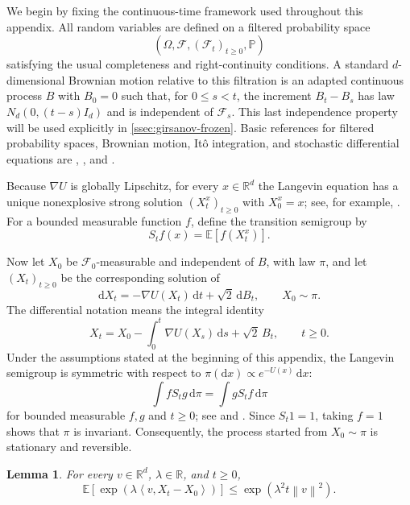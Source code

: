 \documentclass[11pt]{article}
\newtheorem{lemma}[lemma]{Lemma}
\newcommand{\R}{\mathbb R}
\newcommand{\E}{\mathbb E}
\newcommand{\ip}[2]{\left\langle #1,#2\right\rangle}
\newcommand{\norm}[1]{\left\lVert #1\right\rVert}
\newcommand{\1}{\mathbf 1}
\newcommand{\df}{\mathrm{d}}
\begin{document}
	We begin by fixing the continuous-time framework used throughout this
	appendix. All random variables are defined on a filtered probability
	space
	\[
	(\Omega,\mathcal F,(\mathcal F_t)_{t\geq0},\mathbb P)
	\]
	satisfying the usual completeness and right-continuity conditions.
	A standard \(d\)-dimensional Brownian motion relative to this filtration
	is an adapted continuous process \(B\) with \(B_0=0\) such that, for
	\(0\leq s<t\), the increment \(B_t-B_s\) has law
	\(N_d(0,(t-s)I_d)\) and is independent of \(\mathcal F_s\).
	This last independence property will be used explicitly in
	\cref{ssec:girsanov-frozen}.
	Basic references for filtered probability spaces, Brownian motion,
	It\^o integration, and stochastic differential equations are
	\citet[Chapters~3 and~5]{KaratzasShreve1991},
	\citet[Chapters~IV and~IX]{RevuzYor1999}, and
	\citet{Kallenberg2021}.
	
	Because \(\nabla U\) is globally Lipschitz, for every \(x\in\R^d\)
	the Langevin equation has a unique nonexplosive strong solution
	\((X_t^x)_{t\geq0}\) with \(X_0^x=x\); see, for example,
	\citet[Chapter~5]{KaratzasShreve1991}.
	For a bounded measurable function \(f\), define the transition
	semigroup by
	\[
	S_tf(x)=\E[f(X_t^x)].
	\]
	
	Now let \(X_0\) be \(\mathcal F_0\)-measurable and independent of \(B\),
	with law \(\pi\), and let \((X_t)_{t\geq0}\) be the corresponding
	solution of
	\begin{equation}\label{eq:langevin-sde}
		\df X_t=-\nabla U(X_t)\,\df t+\sqrt{2}\,\df B_t,
		\qquad X_0\sim\pi.
	\end{equation}
	The differential notation means the integral identity
	\begin{equation}\label{eq:langevin-integral}
		X_t=X_0-\int_0^t\nabla U(X_s)\,\df s+\sqrt{2}\,B_t,
		\qquad t\geq0.
	\end{equation}
	Under the assumptions stated at the beginning of this appendix,
	the Langevin semigroup is symmetric with respect to
	\(\pi(\df x)\propto e^{-U(x)}\,\df x\):
	\[
	\int fS_tg\,\df\pi=\int gS_tf\,\df\pi
	\]
	for bounded measurable \(f,g\) and \(t\geq0\); see
	\citet[Section~2]{DurmusMoulines2017} and
	\citet[Chapters~1 and~7]{FukushimaOshimaTakeda2011}.
	Since \(S_t1=1\), taking \(f=1\) shows that \(\pi\) is invariant.
	Consequently, the process started from \(X_0\sim\pi\) is stationary
	and reversible.
	
	\begin{lemma}\label{lem:linear-increment}
		For every \(v\in\R^d\), \(\lambda\in\R\), and \(t\geq0\),
		\begin{equation}\label{eq:linear-increment-mgf}
			\E[\exp(\lambda\ip{v}{X_t-X_0})]
			\leq
			\exp(\lambda^2t\norm{v}^2).
		\end{equation}
	\end{lemma}
	
\end{document}

